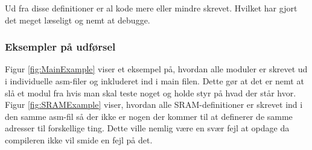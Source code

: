 Ud fra disse definitioner er al kode mere eller mindre skrevet. Hvilket har gjort det meget læseligt og nemt at debugge.

\subsubsection{Eksempler på udførsel}
Figur \ref{fig:MainExample} viser et eksempel på, hvordan alle moduler er skrevet ud i individuelle asm-filer og inkluderet ind i main filen. Dette gør at det er nemt at slå et modul fra hvis man skal teste noget og holde styr på hvad der står hvor. Figur \ref{fig:SRAMExample} viser, hvordan alle SRAM-definitioner er skrevet ind i den samme asm-fil så der ikke er nogen der kommer til at definerer de samme adresser til forskellige ting. Dette ville nemlig være en svær fejl at opdage da compileren ikke vil smide en fejl på det. 

